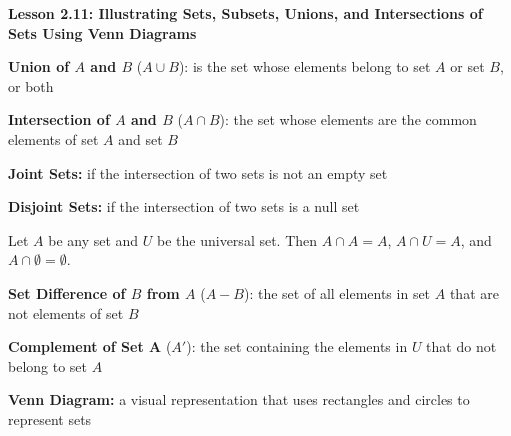 \begin{center}
\textbf{Lesson 2.11: Illustrating Sets, Subsets, Unions, and Intersections of Sets Using Venn Diagrams}
\end{center}

\vspace*{-1.5ex}

\noindent\textbf{Union of \(A\) and \(B\)} (\(A \cup B\)): is the set whose elements belong to set \(A\) or set \(B\), or both

\noindent\textbf{Intersection of \(A\) and \(B\)} (\(A \cap B\)): the set whose elements are the common elements of set \(A\) and set \(B\) 

\noindent\textbf{Joint Sets:} if the intersection of two sets is not an empty set

\noindent\textbf{Disjoint Sets:} if the intersection of two sets is a null set

\noindent Let \(A\) be any set and \(U\) be the universal set. Then \(A \cap A = A\), \(A \cap U = A\), and \(A \cap \emptyset = \emptyset\).

\noindent\textbf{Set Difference of \(B\) from \(A\)} (\(A - B\)): the set of all elements in set \(A\) that are not elements of set \(B\)

\noindent\textbf{Complement of Set A} (\(A'\)): the set containing the elements in \(U\) that do not belong to set \(A\)

\noindent\textbf{Venn Diagram:} a visual representation that uses rectangles and circles to represent sets



